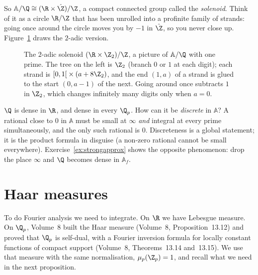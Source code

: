 So $\mathbb{A}/\Q\cong(\R\times\hat{\Z})/\Z$, a compact connected group called the \emph{solenoid}. Think of it as a circle $\R/\Z$ that
has been unrolled into a profinite family of strands: going once around the circle moves you by $-1$ in $\hat{\Z}$, so you never close up.
Figure~\ref{fig:solenoid} draws the $2$-adic version.

\begin{figure}[ht]
\centering
{}
\caption{The $2$-adic solenoid $(\R\times\Z_2)/\Z$, a picture of $\mathbb{A}/\Q$ with one prime. The tree on the left is $\Z_2$ (branch
$0$ or $1$ at each digit); each strand is $\left[0,1\right[\times(a+8\Z_2)$, and the end $(1,a)$ of a strand is glued to the start
$(0,a-1)$ of the next. Going around once subtracts $1$ in $\Z_2$, which changes infinitely many digits only when $a=0$.}
\label{fig:solenoid}
\end{figure}

\begin{think}
$\Q$ is dense in $\R$, and dense in every $\Q_p$. How can it be \emph{discrete} in $\mathbb{A}$? A rational close to $0$ in $\mathbb{A}$ must be
small at $\infty$ \emph{and} integral at every prime simultaneously, and the only such rational is $0$. Discreteness is a
global statement; it is the product formula in disguise (a non-zero rational cannot be small everywhere). Exercise~\ref{ex:strongapprox}
shows the opposite phenomenon: drop the place $\infty$ and $\Q$ becomes dense in $\mathbb{A}_f$.
\end{think}

\section{Haar measures}

To do Fourier analysis we need to integrate. On $\R$ we have Lebesgue measure. On $\Q_p$, Volume~8 built the Haar measure
(Volume~8, Proposition~13.12) and proved that $\Q_p$ is self-dual, with a Fourier inversion formula for locally constant functions
of compact support (Volume~8, Theorems~13.14 and~13.15). We use that measure with the same normalisation, $\mu_p(\Z_p)=1$, and
recall what we need in the next proposition.

